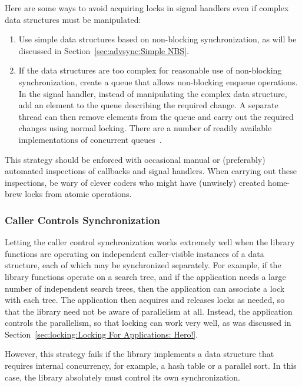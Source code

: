 Here are some ways to avoid acquiring locks in signal handlers even
if complex data structures must be manipulated:

\begin{enumerate}
\item	Use simple data structures based on non-blocking synchronization,
	as will be discussed in
	Section~\ref{sec:advsync:Simple NBS}.
\item	If the data structures are too complex for reasonable use of
	non-blocking synchronization, create a queue that allows
	non-blocking enqueue operations.
	In the signal handler, instead of manipulating the complex
	data structure, add an element to the queue describing the
	required change.
	A separate thread can then remove elements from the queue and
	carry out the required changes using normal locking.
	There are a number of readily available implementations of
	concurrent
	queues~\cite{ChristophMKirsch2012FIFOisntTR,MathieuDesnoyers2009URCU,MichaelScott96}.
\end{enumerate}

This strategy should be enforced with occasional manual or (preferably)
automated inspections of callbacks and signal handlers.
When carrying out these inspections, be wary of clever coders who
might have (unwisely) created home-brew locks from atomic operations.

\subsubsection{Caller Controls Synchronization}
\label{sec:locking:Caller Controls Synchronization}

Letting the caller control synchronization
works extremely well when the library functions are operating
on independent caller-visible instances of a data structure, each
of which may be synchronized separately.
For example, if the library functions operate on a search tree,
and if the application needs a large number of independent search
trees, then the application can associate a lock with each tree.
The application then acquires and releases locks as needed, so
that the library need not be aware of parallelism at all.
Instead, the application controls the parallelism, so that locking
can work very well, as was discussed in
Section~\ref{sec:locking:Locking For Applications: Hero!}.

However, this strategy fails if the
library implements a data structure that requires internal
concurrency, for example, a hash table or a parallel sort.
In this case, the library absolutely must control its own
synchronization.

